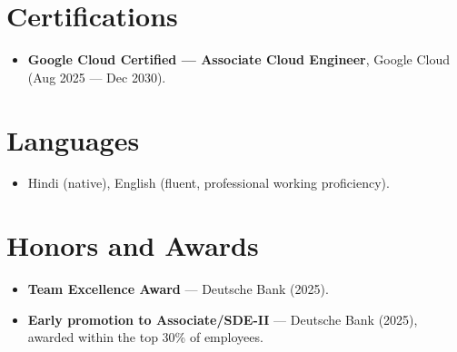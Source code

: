 \documentclass[11pt,a4paper,sans]{moderncv}
\begin{document}
\section{Certifications}
\vspace{1pt}
\begin{itemize}
\item{\textbf{Google Cloud Certified --- Associate Cloud Engineer}, Google Cloud (Aug 2025 --- Dec 2030).}
\end{itemize}


\section{Languages}
\vspace{1pt}
\begin{itemize}
\item Hindi (native), English (fluent, professional working proficiency).
\end{itemize}


\section{Honors and Awards}
\vspace{1pt}
\begin{itemize}
\item{\textbf{Team Excellence Award} --- Deutsche Bank (2025).}
\item{\textbf{Early promotion to Associate/SDE-II} --- Deutsche Bank (2025), awarded within the top 30\% of employees.}
\end{itemize}
\end{document}
